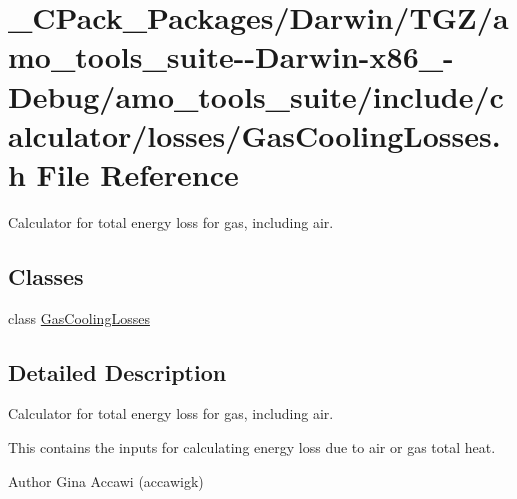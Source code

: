 \hypertarget{___c_pack___packages_2_darwin_2_t_g_z_2amo__tools__suite--_darwin-x86__64-_debug_2amo__tools__su8eec75628bb46b93c37230876b9156a0}{}\section{\+\_\+\+C\+Pack\+\_\+\+Packages/\+Darwin/\+T\+G\+Z/amo\+\_\+tools\+\_\+suite-\/-\/\+Darwin-\/x86\+\_-\/\+Debug/amo\+\_\+tools\+\_\+suite/include/calculator/losses/\+Gas\+Cooling\+Losses.h File Reference}
\label{___c_pack___packages_2_darwin_2_t_g_z_2amo__tools__suite--_darwin-x86__64-_debug_2amo__tools__su8eec75628bb46b93c37230876b9156a0}


Calculator for total energy loss for gas, including air.  


\subsection*{Classes}
\begin{DoxyCompactItemize}
\item 
class \hyperlink{class_gas_cooling_losses}{Gas\+Cooling\+Losses}
\end{DoxyCompactItemize}


\subsection{Detailed Description}
Calculator for total energy loss for gas, including air. 

This contains the inputs for calculating energy loss due to air or gas total heat.

\begin{DoxyAuthor}{Author}
Gina Accawi (accawigk) 
\end{DoxyAuthor}
